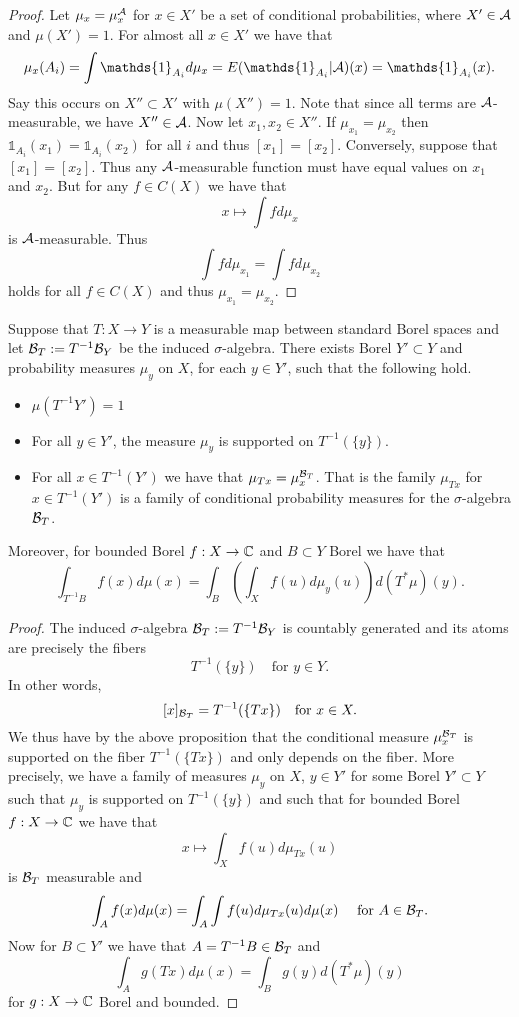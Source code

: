 \documentclass[twoside, a4paper, 10pt]{amsart}
\begin{document}
\begin{proof} Let $\mu_x = \mu_x^{\mathcal{A}}$ for $x \in X'$ be a set of conditional probabilities, where $X' \in \mathcal{A}$ and $\mu(X')=1$. For almost all $x \in X'$ we have that $$\mu_x(A_i) = \int \mathds{1}_{A_i} d\mu_x = E(\mathds{1}_{A_i}|\cA)(x) = \mathds{1}_{A_i}(x).$$ Say this occurs on $X'' \subset X'$ with $\mu(X'')=1$. Note that since all terms are $\mathcal{A}$-measurable, we have $X'' \in \mathcal{A}$. Now let $x_1,x_2 \in X''$. If $\mu_{x_1} = \mu_{x_2}$ then $\mathds{1}_{A_i}(x_1) = \mathds{1}_{A_i}(x_2)$ for all $i$ and thus $[x_1] = [x_2]$. Conversely, suppose that $[x_1]=[x_2]$. Thus any $\mathcal{A}$-measurable function must have equal values on $x_1$ and $x_2$. But for any $f \in C(X)$ we have that $$x \mapsto \int f d\mu_x$$ is $\mathcal{A}$-measurable. Thus $$\int f d\mu_{x_1} = \int f d \mu_{x_2}$$ holds for all $f \in C(X)$ and thus $\mu_{x_1} = \mu_{x_2}$. \end{proof}

\begin{thm} Suppose that $T:X\to Y$ is a measurable map between standard Borel spaces and let $\mathcal{B}_T := T^{-1}\mathcal{B}_Y$ be the induced $\sigma$-algebra. There exists Borel $Y' \subset Y$ and probability measures $\mu_y$ on $X$, for each $y \in Y'$, such that the following hold.

\begin{itemize}
	\item $\mu(T^{-1}Y') = 1$
	\item For all $y \in Y'$, the measure $\mu_y$ is supported on $T^{-1}(\{y \})$.
	\item For all $x \in T^{-1}(Y')$ we have that $\mu_{Tx} = \mu_{x}^{\mathcal{B}_T}$. That is the family $\mu_{Tx}$ for $x \in T^{-1}(Y')$ is a family of conditional probability measures for the $\sigma$-algebra $\mathcal{B}_T$.
\end{itemize}

Moreover, for bounded Borel $f: X \to \mathbb{C}$ and $B \subset Y$ Borel we have that $$\int_{T^{-1}B} f(x) d\mu(x) = \int_{B} \left( \int_X f(u) d\mu_y(u) \right) d(T^*\mu)(y).$$

\end{thm}

\begin{proof} The induced $\sigma$-algebra $\mathcal{B}_T := T^{-1}\mathcal{B}_Y$ is countably generated and its atoms are precisely the fibers $$T^{-1}(\{y\}) \quad \text{for } y \in Y.$$ In other words, $$[x]_{\mathcal{B}_T} = T^{-1}(\{ Tx \}) \quad \text{for } x \in X.$$ We thus have by the above proposition that the conditional measure $\mu_{x}^{\mathcal{B}_T}$ is supported on the fiber $T^{-1}(\{Tx\})$ and only depends on the fiber. More precisely, we have a family of measures $\mu_y$ on $X$, $y \in Y'$ for some Borel $Y' \subset Y$ such that $\mu_y$ is supported on $T^{-1}(\{y \})$ and such that for bounded Borel $f:X \to \mathbb{C}$ we have that $$x \mapsto \int_X f(u) d\mu_{Tx}(u)$$ is $\mathcal{B}_T$ measurable and $$\int_A f(x) d\mu(x) = \int_A \int f(u) d\mu_{Tx}(u) d\mu(x) \quad \text{ for } A \in \mathcal{B}_T.$$ Now for $B \subset Y'$ we have that $A= T^{-1}B \in \mathcal{B}_T$ and $$\int_A g(Tx) d\mu(x) = \int_B g(y) d (T^*\mu)(y)$$ for $g:X \to \mathbb{C}$ Borel and bounded. \end{proof}
\end{document}
